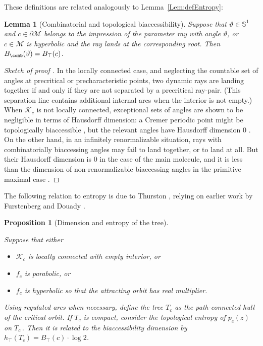 \documentclass[12pt]{amsart}
\newcommand{\M}{\mathscr M}
\newcommand{\Circle}{\mathbb S^1}
\newcommand{\0}{\texttt{0}}
\newcommand{\1}{\texttt{1}}
\newtheorem{lemma}[theorem]{Lemma}
\newtheorem{proposition}[theorem]{Proposition}
\theoremstyle{definition}
\numberwithin{equation}{section}
\renewcommand{\theta}{\vartheta}
\newcommand{\lineclear}{\rule{0pt}{2pt}\newline}
\begin{document}
These definitions are related analogously to Lemma~\ref{Lem:defEntropy}:

\begin{lemma}[Combinatorial and topological biaccessibility]
\lineclear
Suppose that $\theta\in \Circle$ and $c\in\partial\M$ belongs to the impression
of the parameter ray with angle $\theta$, or $c\in\M$ is hyperbolic and the
ray lands at the corresponding root. Then $B_\comb(\theta)=B_\top(c)$.
\end{lemma}
\begin{proof}[Sketch of proof \cite{SymDyn, Jung}] 
In the locally
connected case, and neglecting the countable set of angles at precritical
or precharacteristic points, two dynamic rays are landing together if and only
if they are not separated by a precritical ray-pair. (This separation line
contains additional internal arcs when the interior is not empty.)
When $\mathcal{K}_c$ is not locally connected, exceptional sets of angles are
shown to be negligible in terms of Hausdorff dimension: a Cremer periodic point
might be topologically biaccessible \cite{SchleicherZakeri}, but the relevant
angles have Hausdorff dimension 0 \cite{BullettSentenac}. On the other hand, in
an infinitely renormalizable situation, rays with combinatorially biaccessing
angles may fail to land together, or to land at all. But their Hausdorff
dimension is 0 in the case of the main molecule, and it is less than the
dimension of non-renormalizable biaccessing angles in the primitive maximal
case \cite{Jung}.
\end{proof}


The following relation to entropy is due to Thurston \cite{TanLeiEntropy},
relying on earlier work by Furstenberg \cite{Furstenberg}
and Douady \cite{Douady}.

\begin{proposition}[Dimension and entropy of the tree]\label{Prop:Biaccessibility} \lineclear
Suppose that either
\begin{itemize}
\item
 $\mathcal{K}_c$ is locally connected with empty interior, or 
\item $f_c$ is parabolic, or 
\item $f_c$ is hyperbolic so that the attracting orbit has real multiplier.
\end{itemize}
Using regulated arcs when necessary, define the tree $T_c$ as the path-connected hull of
the critical orbit. If $T_c$ is compact, consider the topological entropy of
$p_c(z)$ on $T_c$\,. Then it is related to
the biaccessibility dimension by $h_\top(T_c)=B_\top(c)\cdot\log2$.
\end{proposition}
\end{document}
